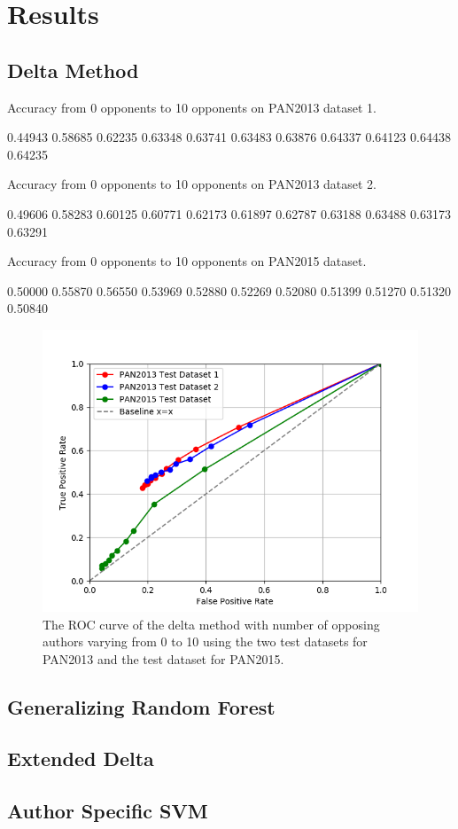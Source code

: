 \section{Results}

\subsection{Delta Method}
Accuracy from 0 opponents to 10 opponents on PAN2013 dataset 1.

0.44943
0.58685
0.62235
0.63348
0.63741
0.63483
0.63876
0.64337
0.64123
0.64438
0.64235

Accuracy from 0 opponents to 10 opponents on PAN2013 dataset 2.

0.49606
0.58283
0.60125
0.60771
0.62173
0.61897
0.62787
0.63188
0.63488
0.63173
0.63291

Accuracy from 0 opponents to 10 opponents on PAN2015 dataset.

0.50000
0.55870
0.56550
0.53969
0.52880
0.52269
0.52080
0.51399
0.51270
0.51320
0.50840

\begin{figure}
    \centering
    \includegraphics[width=.7\textwidth]{./pictures/delta_method_roc.png}
    \caption{The ROC curve of the delta method with number of opposing authors
    varying from 0 to 10 using the two test datasets for PAN2013 and the test
    dataset for PAN2015.}
    \label{fig:delta_method_roc}
\end{figure}

\subsection{Generalizing Random Forest}

\subsection{Extended Delta}

\subsection{Author Specific SVM}
